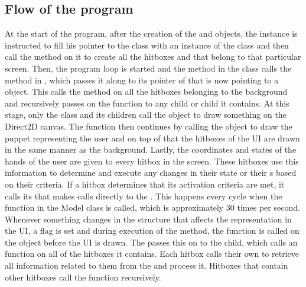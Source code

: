 \subsection{Flow of the program}

At the start of the program, after the creation of the  and  objects, the  instance is instructed to fill his pointer to the  class with an instance of the  class and then call the method  on it to create all the hitboxes and  that belong to that particular screen. Then, the program loop is started and the  method in the  class calls the  method in , which passes it along to its pointer of   that is now pointing to a  object. This calls the  method on all the hitboxes belonging to the background and recursively passes on the  function to any  child or  child it contains. At this stage, only the  class and its children call the  object to draw something on the Direct2D canvas. The  function then continues by calling the  object to draw the puppet representing the user and on top of that the hitboxes of the UI are drawn in the same manner as the background. Lastly, the coordinates and states of the hands of the user are given to every hitbox in the screen. These hitboxes use this information to determine and execute any changes in their state or their s based on their criteria. If a hitbox determines that its activation criteria are met, it calls its  that makes calls directly to the . This happens every cycle when the  function in the Model class is called, which is approximately 30 times per second.\\

Whenever something changes in the  structure that affects the representation in the UI, a flag is set and during execution of the   method, the  function is called on the  object before the UI is drawn. The  passes this on to the  child, which calls an  function on all of the hitboxes it contains. Each hitbox calls their own  to retrieve all information related to them from the  and process it. Hitboxes that contain other hitboxes call the  function recursively.


